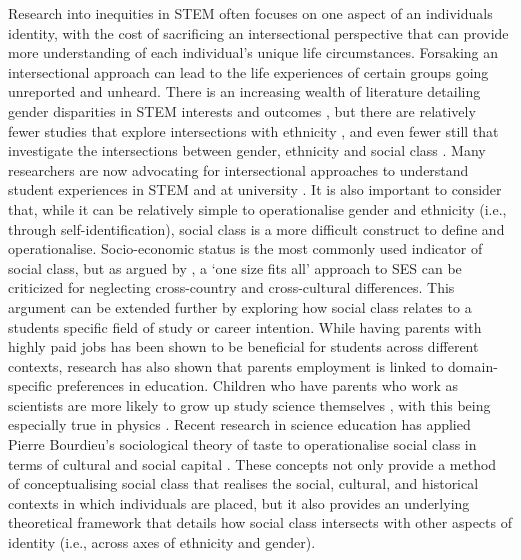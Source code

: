 Research into inequities in STEM often focuses on one aspect of an individuals identity, with the cost of sacrificing an intersectional perspective that can provide more understanding of each individual's unique life circumstances. Forsaking an intersectional approach can lead to the life experiences of certain groups going unreported and unheard. There is an increasing wealth of literature detailing gender disparities in STEM interests and outcomes \citep{Sue2009,wang2017gender}, but there are relatively fewer studies that explore intersections with ethnicity \citep{fouad2017scct,grossman2014perceived}, and even fewer still that investigate the intersections between gender, ethnicity and social class \citep{archer2013aspires}. Many researchers are now advocating for intersectional approaches to understand student experiences in STEM and at university \citep{jury2017experience}. It is also important to consider that, while it can be relatively simple to operationalise gender and ethnicity (i.e., through self-identification), social class is a more difficult construct to define and operationalise. Socio-economic status is the most commonly used indicator of social class, but as argued by \cite{rutkowski2013measuring}, a `one size fits all' approach to SES can be criticized for neglecting cross-country and cross-cultural differences. This argument can be extended further by exploring how social class relates to a students specific field of study or career intention. While having parents with highly paid jobs has been shown to be beneficial for students across different contexts, research has also shown that parents employment is linked to domain-specific preferences in education. Children who have parents who work as scientists are more likely to grow up study science themselves \cite{moakler2014college}, with this being especially true in physics \citep{upshot}. Recent research in science education has applied Pierre Bourdieu's sociological theory of taste to operationalise social class in terms of cultural and social capital \citep{Archer_2015}. These concepts not only provide a method of conceptualising social class that realises the social, cultural, and historical contexts in which individuals are placed, but it also provides an underlying theoretical framework that details how social class intersects with other aspects of identity (i.e., across axes of ethnicity and gender). 

